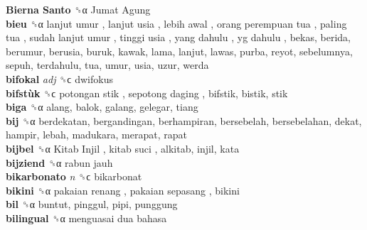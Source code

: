 \textbf{Bierna Santo} ␝α   Jumat Agung   \\
\textbf{bieu} ␝α   lanjut umur ,  lanjut usia ,  lebih awal ,  orang perempuan tua ,  paling tua ,  sudah lanjut umur ,  tinggi usia ,  yang dahulu ,  yg dahulu , bekas, berida, berumur, berusia, buruk, kawak, lama, lanjut, lawas, purba, reyot, sebelumnya, sepuh, terdahulu, tua, umur, usia, uzur, werda  \\
\textbf{bifokal} \emph{adj}  ␝ϲ  dwifokus  \\
\textbf{bifstùk} ␝ϲ   potongan stik ,  sepotong daging , bifstik, bistik, stik  \\
\textbf{biga} ␝α  alang, balok, galang, gelegar, tiang  \\
\textbf{bij} ␝α  berdekatan, bergandingan, berhampiran, bersebelah, bersebelahan, dekat, hampir, lebah, madukara, merapat, rapat  \\
\textbf{bijbel} ␝α   Kitab Injil ,  kitab suci , alkitab, injil, kata  \\
\textbf{bijziend} ␝α   rabun jauh   \\
\textbf{bikarbonato} \emph{n}  ␝ϲ  bikarbonat  \\
\textbf{bikini} ␝α   pakaian renang ,  pakaian sepasang , bikini  \\
\textbf{bil} ␝α  buntut, pinggul, pipi, punggung  \\
\textbf{bilingual} ␝α   menguasai dua bahasa   \\
